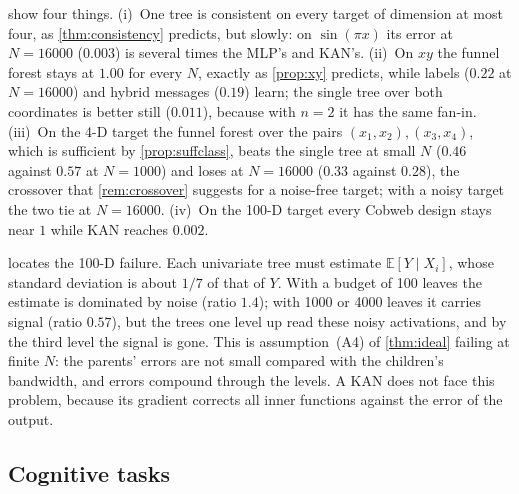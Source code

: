 \documentclass[11pt]{article}
\theoremstyle{definition}
\theoremstyle{remark}
\newcommand{\E}{\mathbb{E}}
\begin{document}
 show four things.
(i)~One tree is consistent on every target of dimension at most four, as
\cref{thm:consistency} predicts, but slowly: on $\sin(\pi x)$ its error at $N=16000$
($0.003$) is several times the MLP's and KAN's.
(ii)~On $xy$ the funnel forest stays at $1.00$ for every $N$, exactly as
\cref{prop:xy} predicts, while labels ($0.22$ at $N=16000$) and hybrid messages
($0.19$) learn; the single tree over both coordinates is better still ($0.011$),
because with $n=2$ it has the same fan-in.
(iii)~On the 4-D target the funnel forest over the pairs $(x_1,x_2),(x_3,x_4)$, which is
sufficient by \cref{prop:suffclass}, beats the single tree at small $N$ ($0.46$ against
$0.57$ at $N=1000$) and loses at $N=16000$ ($0.33$ against $0.28$), the crossover that
\cref{rem:crossover} suggests for a noise-free target; with a noisy target the two tie
at $N=16000$.
(iv)~On the 100-D target every Cobweb design stays near $1$ while KAN reaches $0.002$.

\begin{table}[t]
\centering\small
\resizebox{\linewidth}{!}{}
\caption{The 100-D funnel forest level by level ($N$ training points, one seed): RMSE
of every tree's activation divided by the standard deviation of its ideal message
$m_S$, averaged over the trees of a level.  A ratio near $1$ means the activation
carries no information about $m_S$.}
\label{tab:diag100}
\end{table}

 locates the 100-D failure.  Each univariate tree must estimate
$\E[Y\mid X_i]$, whose standard deviation is about $1/7$ of that of $Y$.  With a budget of
100 leaves the estimate is dominated by noise (ratio $1.4$); with 1000 or 4000 leaves it
carries signal (ratio $0.57$), but the trees one level up read these noisy activations,
and by the third level the signal is gone.  This is assumption~(A4) of \cref{thm:ideal}
failing at finite $N$: the parents' errors are not small compared with the children's
bandwidth, and errors compound through the levels.  A KAN does not face this problem,
because its gradient corrects all inner functions against the error of the output.

\subsection{Cognitive tasks}\label{sec:exp-tasks}

\begin{table}[t]
\centering\small

\caption{The two sign worlds of \cref{thm:locality} (five seeds).  Left: a tree that
perceives $x_2$ and predicts $Y$---its validation RMSE equals that of the constant
predictor ($1.00$) and its activation is flat in both worlds.  Right: the composing
tree's test RMSE for four task assignments.}
\label{tab:locality}
\end{table}
\end{document}
